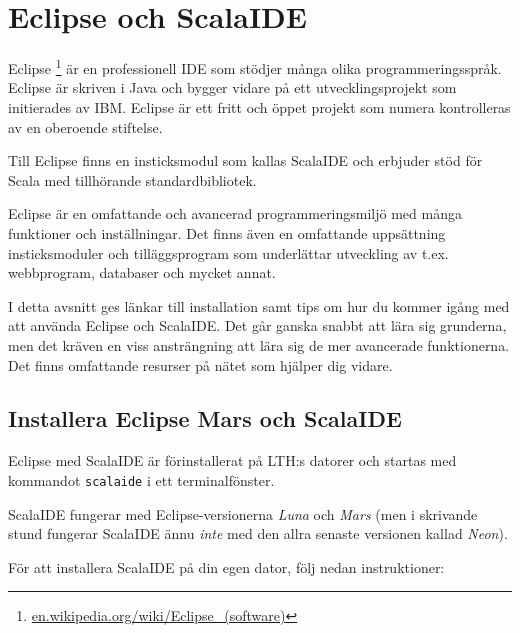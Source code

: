 \newpage

\section{Eclipse och ScalaIDE}\label{appendix:ide:eclipse}

Eclipse%
\footnote{\href{https://en.wikipedia.org/wiki/Eclipse_(software)}{en.wikipedia.org/wiki/Eclipse\_(software)}}
är en professionell IDE som stödjer många olika programmeringsspråk. Eclipse är skriven i Java och bygger vidare på ett utvecklingsprojekt som initierades av IBM. Eclipse är ett fritt och öppet projekt som numera kontrolleras av en oberoende stiftelse.

Till Eclipse finns en insticksmodul  som kallas ScalaIDE och erbjuder stöd för Scala med tillhörande standardbibliotek.

Eclipse är en omfattande och avancerad programmeringsmiljö med många funktioner och inställningar. Det finns även en omfattande uppsättning insticksmoduler och tilläggsprogram som underlättar utveckling av t.ex. webbprogram, databaser och mycket annat. 

I detta avsnitt ges länkar till installation samt tips om hur du kommer igång med att använda Eclipse och ScalaIDE. Det går ganska snabbt att lära sig grunderna, men det kräven en viss ansträngning att lära sig de mer avancerade funktionerna. Det finns omfattande resurser på nätet som hjälper dig vidare. 


\subsection{Installera Eclipse Mars och ScalaIDE}\label{appendix:ide:eclipse:install}

Eclipse med ScalaIDE är förinstallerat på LTH:s datorer och startas med kommandot \texttt{scalaide} i ett terminalfönster.

ScalaIDE fungerar med Eclipse-versionerna \textit{Luna} och \textit{Mars} (men i skrivande stund fungerar ScalaIDE ännu \textit{inte} med den allra senaste versionen kallad \textit{Neon}). 

För att installera ScalaIDE på din egen dator, följ nedan instruktioner: 

